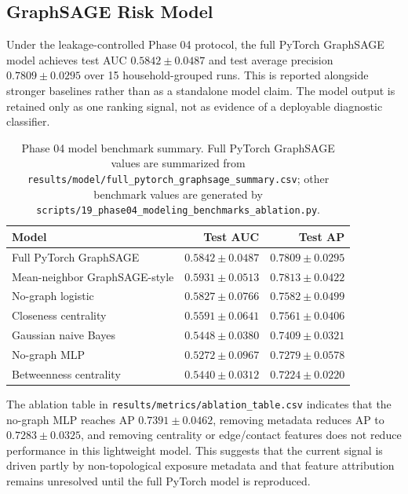 \documentclass[11pt,a4paper]{article}
\begin{document}
\subsection{GraphSAGE Risk Model}

Under the leakage-controlled Phase 04 protocol, the full PyTorch GraphSAGE model achieves test AUC \(0.5842 \pm 0.0487\) and test average precision \(0.7809 \pm 0.0295\) over 15 household-grouped runs. This is reported alongside stronger baselines rather than as a standalone model claim. The model output is retained only as one ranking signal, not as evidence of a deployable diagnostic classifier.

\begin{table}[htbp]
\centering
\caption{Phase 04 model benchmark summary. Full PyTorch GraphSAGE values are summarized from \texttt{results/model/full\_pytorch\_graphsage\_summary.csv}; other benchmark values are generated by \texttt{scripts/19\_phase04\_modeling\_benchmarks\_ablation.py}.}
\label{tab:gnn-performance}
\begin{tabular}{lrr}
\toprule
Model & Test AUC & Test AP \\
\midrule
Full PyTorch GraphSAGE & \(0.5842 \pm 0.0487\) & \(0.7809 \pm 0.0295\) \\
Mean-neighbor GraphSAGE-style & \(0.5931 \pm 0.0513\) & \(0.7813 \pm 0.0422\) \\
No-graph logistic & \(0.5827 \pm 0.0766\) & \(0.7582 \pm 0.0499\) \\
Closeness centrality & \(0.5591 \pm 0.0641\) & \(0.7561 \pm 0.0406\) \\
Gaussian naive Bayes & \(0.5448 \pm 0.0380\) & \(0.7409 \pm 0.0321\) \\
No-graph MLP & \(0.5272 \pm 0.0967\) & \(0.7279 \pm 0.0578\) \\
Betweenness centrality & \(0.5440 \pm 0.0312\) & \(0.7224 \pm 0.0220\) \\
\bottomrule
\end{tabular}
\end{table}

The ablation table in \texttt{results/metrics/ablation\_table.csv} indicates that the no-graph MLP reaches AP \(0.7391 \pm 0.0462\), removing metadata reduces AP to \(0.7283 \pm 0.0325\), and removing centrality or edge/contact features does not reduce performance in this lightweight model. This suggests that the current signal is driven partly by non-topological exposure metadata and that feature attribution remains unresolved until the full PyTorch model is reproduced.
\end{document}
